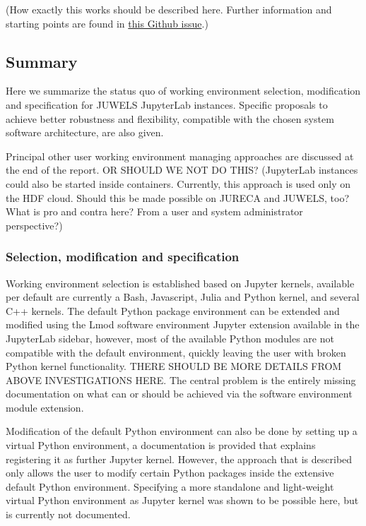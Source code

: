 (How exactly this works should be described here. Further information and starting points are found in \href{https://github.com/ExaESM-WP4/JupyterHub-Evaluation-Whitepaper/issues/6}{this Github issue}.)

\subsection{Summary}
\label{sect:working-envs:summary}

Here we summarize the status quo of working environment selection, modification and specification for JUWELS JupyterLab instances.
Specific proposals to achieve better robustness and flexibility, compatible with the chosen system software architecture, are also given.

Principal other user working environment managing approaches are discussed at the end of the report. OR SHOULD WE NOT DO THIS? (JupyterLab instances could also be started inside containers. Currently, this approach is used only on the HDF cloud. Should this be made possible on JURECA and JUWELS, too? What is pro and contra here? From a user and system administrator perspective?)

\subsubsection{Selection, modification and specification}

Working environment selection is established based on Jupyter kernels, available per default are currently a Bash, Javascript, Julia and Python kernel, and several C++ kernels.
The default Python package environment can be extended and modified using the Lmod software environment Jupyter extension available in the JupyterLab sidebar, however, most of the available Python modules are not compatible with the default environment, quickly leaving the user with broken Python kernel functionality.
THERE SHOULD BE MORE DETAILS FROM ABOVE INVESTIGATIONS HERE.
The central problem is the entirely missing documentation on what can or should be achieved via the software environment module extension.

Modification of the default Python environment can also be done by setting up a virtual Python environment, a documentation is provided that explains registering it as further Jupyter kernel.
However, the approach that is described only allows the user to modify certain Python packages inside the extensive default Python environment.
Specifying a more standalone and light-weight virtual Python environment as Jupyter kernel was shown to be possible here, but is currently not documented.

